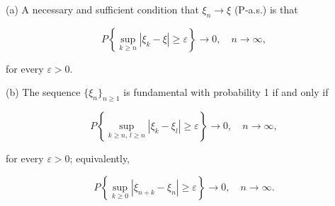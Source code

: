 (a) A necessary and sufficient condition that $\xi_n \to \xi$ (P-a.s.) is that

$$P\left\{ \sup_{k \geq n} |\xi_k - \xi| \geq \varepsilon \right\} \to 0, \quad n \to \infty,$$

for every $\varepsilon > 0$.

(b) The sequence $\{\xi_n\}_{n \geq 1}$ is fundamental with probability 1 if and only if

$$P\left\{ \sup_{k \geq n,\, l \geq n} |\xi_k - \xi_l| \geq \varepsilon \right\} \to 0, \quad n \to \infty,$$

for every $\varepsilon > 0$; equivalently,

$$P\left\{ \sup_{k \geq 0} |\xi_{n+k} - \xi_n| \geq \varepsilon \right\} \to 0, \quad n \to \infty.$$
